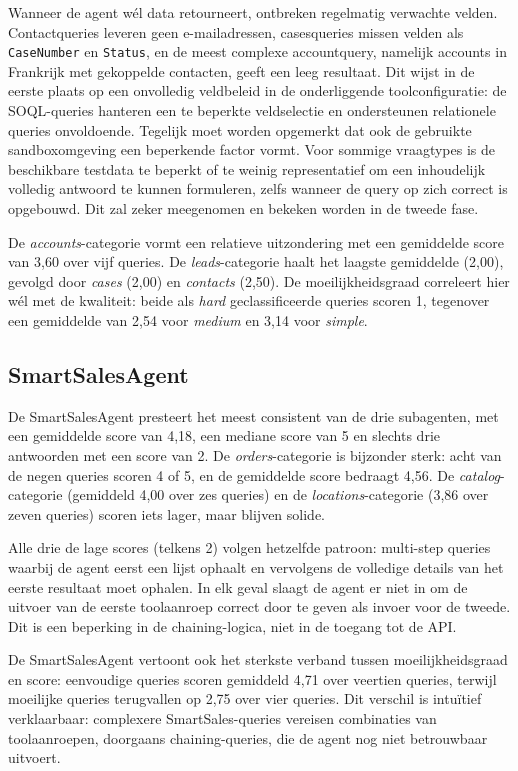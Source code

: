 Wanneer de agent wél data retourneert, ontbreken regelmatig verwachte velden. Contactqueries leveren geen e-mailadressen, casesqueries missen velden als \texttt{CaseNumber} en \texttt{Status}, en de meest complexe accountquery, namelijk accounts in Frankrijk met gekoppelde contacten, geeft een leeg resultaat. Dit wijst in de eerste plaats op een onvolledig veldbeleid in de onderliggende toolconfiguratie: de SOQL-queries hanteren een te beperkte veldselectie en ondersteunen relationele queries onvoldoende. Tegelijk moet worden opgemerkt dat ook de gebruikte sandboxomgeving een beperkende factor vormt. Voor sommige vraagtypes is de beschikbare testdata te beperkt of te weinig representatief om een inhoudelijk volledig antwoord te kunnen formuleren, zelfs wanneer de query op zich correct is opgebouwd. Dit zal zeker meegenomen en bekeken worden in de tweede fase.

De \textit{accounts}-categorie vormt een relatieve uitzondering met een gemiddelde score van 3,60 over vijf queries. De \textit{leads}-categorie haalt het laagste gemiddelde (2,00), gevolgd door \textit{cases} (2,00) en \textit{contacts} (2,50). De moeilijkheidsgraad correleert hier wél met de kwaliteit: beide als \textit{hard} geclassificeerde queries scoren 1, tegenover een gemiddelde van 2,54 voor \textit{medium} en 3,14 voor \textit{simple}.

\subsection*{SmartSalesAgent}

De SmartSalesAgent presteert het meest consistent van de drie subagenten, met een gemiddelde score van 4,18, een mediane score van 5 en slechts drie antwoorden met een score van 2. De \textit{orders}-categorie is bijzonder sterk: acht van de negen queries scoren 4 of 5, en de gemiddelde score bedraagt 4,56. De \textit{catalog}-categorie (gemiddeld 4,00 over zes queries) en de \textit{locations}-categorie (3,86 over zeven queries) scoren iets lager, maar blijven solide.

Alle drie de lage scores (telkens 2) volgen hetzelfde patroon: multi-step queries waarbij de agent eerst een lijst ophaalt en vervolgens de volledige details van het eerste resultaat moet ophalen. In elk geval slaagt de agent er niet in om de uitvoer van de eerste toolaanroep correct door te geven als invoer voor de tweede. Dit is een beperking in de chaining-logica, niet in de toegang tot de API.

De SmartSalesAgent vertoont ook het sterkste verband tussen moeilijkheidsgraad en score: eenvoudige queries scoren gemiddeld 4,71 over veertien queries, terwijl moeilijke queries terugvallen op 2,75 over vier queries. Dit verschil is intuïtief verklaarbaar: complexere SmartSales-queries vereisen combinaties van toolaanroepen, doorgaans chaining-queries, die de agent nog niet betrouwbaar uitvoert.

